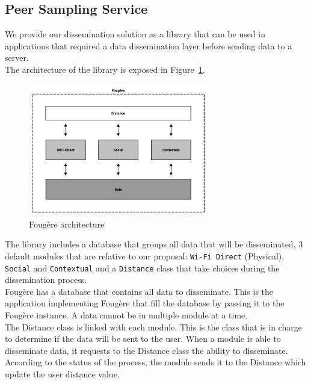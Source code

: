 \subsection{Peer Sampling Service}

We provide our dissemination solution as a library that can be used in applications that required a data dissemination layer before sending data to a server.
\\

The architecture of the library is exposed in Figure~\ref{Fougere}.

\begin{figure}[h]
	\centering
	\includegraphics[width=0.7\textwidth]{figures/fougere}
	\caption{\label{Fougere} Foug\`ere architecture}
\end{figure}

The library includes a database that groups all data that will be disseminated, 3 default modules that are relative to our proposal: \texttt{Wi-Fi Direct} (Physical), \texttt{Social} and \texttt{Contextual} and a \texttt{Distance} class that take choices during the dissemination process.
\\

Foug\`ere has a database that contains all data to disseminate.
This is the application implementing Foug\`ere that fill the database by passing it to the Foug\`ere instance.
A data cannot be in multiple module at a time.
\\

The Distance class is linked with each module.
This is the class that is in charge to determine if the data will be sent to the user.
When a module is able to disseminate data, it requests to the Distance class the ability to disseminate.
According to the status of the process, the module sends it to the Distance which update the user distance value.
\\

